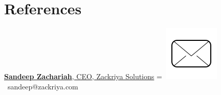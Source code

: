 \documentclass[]{plushcv}
\begin{document}
\begin{minipage}[t]{0.25\textwidth}
\section{References} 
\href{https://www.linkedin.com/in/sandeepzachariah/}{\textbf{Sandeep Zachariah}, CEO, Zackriya Solutions}
\begingroup
{}=\hbox{
\includegraphics[scale=0.1,trim={0 1cm 0cm 0cm}]{icons/main/mail.png}\hspace{0.3cm} sandeep@zackriya.com
}
\parbox{\wd0}{}
\endgroup
\begingroup
\parbox{\wd0}{}\endgroup
\end{minipage} 
\end{document}
